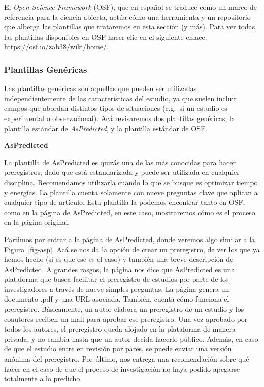\documentclass[
  spanish,
  a4paper,
  oneside]{scrbook}
\begin{document}
El \emph{Open Science Framework} (OSF), que en español se traduce como
un marco de referencia para la ciencia abierta, actúa cómo una
herramienta y un repositorio que alberga las plantillas que trataremos
en esta sección (y más). Para ver todas las plantillas disponibles en
OSF hacer clic en el siguiente enlace:
\url{https://osf.io/zab38/wiki/home/}.

\subsubsection{Plantillas Genéricas}\label{plantillas-genuxe9ricas}

Las plantillas genéricas son aquellas que pueden ser utilizadas
independientemente de las características del estudio, ya que suelen
incluir campos que abordan distintos tipos de situaciones (e.g.~si un
estudio es experimental o observacional). Acá revisaremos dos plantillas
genéricas, la plantilla estándar de \emph{AsPredicted}, y la plantilla
estándar de OSF.

\textbf{AsPredicted}

La plantilla de AsPredicted es quizás una de las más conocidas para
hacer preregistros, dado que está estandarizada y puede ser utilizada en
cualquier disciplina. Recomendamos utilizarla cuando lo que se busque es
optimizar tiempo y energías. La plantilla cuenta solamente con nueve
preguntas clave que aplican a cualquier tipo de artículo. Esta plantilla
la podemos encontrar tanto en OSF, como en la página de AsPredicted, en
este caso, mostraremos cómo es el proceso en la página original.

Partimos por entrar a la página de AsPredicted, donde veremos algo
similar a la Figura~\ref{fig-asp}. Acá se nos da la opción de crear un
preregistro, de ver los que ya hemos hecho (si es que ese es el caso) y
también una breve descripción de AsPredicted. A grandes rasgos, la
página nos dice que AsPredicted es una plataforma que busca facilitar el
preregistro de estudios por parte de los investigadores a través de
nueve simples preguntas. La página genera un documento .pdf y una URL
asociada. También, cuenta cómo funciona el preregistro. Básicamente, un
autor elabora un preregistro de un estudio y los coautores reciben un
mail para aprobar ese preregistro. Una vez aprobado por todos los
autores, el preregistro queda alojado en la plataforma de manera
privada, y no cambia hasta que un autor decida hacerlo público. Además,
en caso de que el estudio entre en revisión por pares, se puede enviar
una versión anónima del preregistro. Por último, nos entrega una
recomendación sobre qué hacer en el caso de que el proceso de
investigación no haya podido apegarse totalmente a lo predicho.
\end{document}
